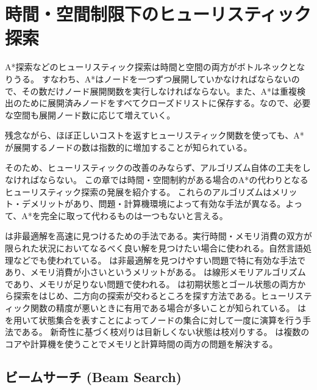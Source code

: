 \chapter{時間・空間制限下のヒューリスティック探索}
\label{ch:heuristic-search-variants}


A*探索などのヒューリスティック探索は時間と空間の両方がボトルネックとなりうる。
すなわち、A*はノードを一つずつ展開していかなければならないので、その数だけノード展開関数を実行しなければならない。また、A*は重複検出のために展開済みノードをすべてクローズドリストに保存する。なので、必要な空間も展開ノード数に応じて増えていく。

残念ながら、ほぼ正しいコストを返すヒューリスティック関数を使っても、A*が展開するノードの数は指数的に増加することが知られている\cite{helmert:08}。

そのため、ヒューリスティックの改善のみならず、アルゴリズム自体の工夫をしなければならない。
この章では時間・空間制約がある場合のA*の代わりとなるヒューリスティック探索の発展を紹介する。
これらのアルゴリズムはメリット・デメリットがあり、問題・計算機環境によって有効な手法が異なる。よって、A*を完全に取って代わるものは一つもないと言える。

は非最適解を高速に見つけるための手法である。実行時間・メモリ消費の双方が限られた状況においてなるべく良い解を見つけたい場合に使われる。自然言語処理などでも使われている。
は非最適解を見つけやすい問題で特に有効な手法であり、メモリ消費が小さいというメリットがある。
は線形メモリアルゴリズムであり、メモリが足りない問題で使われる。
は初期状態とゴール状態の両方から探索をはじめ、二方向の探索が交わるところを探す方法である。ヒューリスティック関数の精度が悪いときに有用である場合が多いことが知られている。
はを用いて状態集合を表すことによってノードの集合に対して一度に演算を行う手法である。
新奇性に基づく枝刈りは目新しくない状態は枝刈りする。
は複数のコアや計算機を使うことでメモリと計算時間の両方の問題を解決する。

\section{ビームサーチ (Beam Search)}
\label{sec:beam-search}

